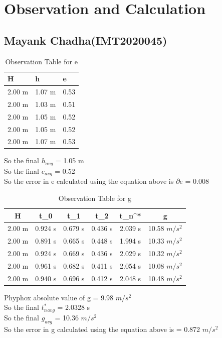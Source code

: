 \documentclass[11pt]{scrartcl} %
\begin{document}
\section{Observation and Calculation}
\subsection{Mayank Chadha(IMT2020045)}

\begin{table}[h] %
	\centering %
	\begin{tabular}{l l l}
		\toprule
		\textbf{H} & \textbf{h} & \textbf{e} \\
		\midrule
		2.00 m & 1.07 m & 0.53\\
        2.00 m & 1.03 m & 0.51\\
        2.00 m & 1.05 m & 0.52\\
        2.00 m & 1.05 m & 0.52\\
        2.00 m & 1.07 m & 0.53\\
		\bottomrule
	\end{tabular}
	\caption{Observation Table for e}
\end{table}
So the final $h_{avg}$ = 1.05 m\\
So the final $e_{avg}$ = 0.52\\
So the error in e calculated using the equation above is $\partial{e}$ = 0.008 

\begin{table}[h]
\centering
\begin{tabular}{||c c c c c c||} 
\toprule
 \hline
 H & t_0 & t_1 & t_2 & t_n^* & g \\ [0.5ex] 
 \midrule
 \hline\hline
 2.00 m & 0.924 s & 0.679 s  & 0.436 s & 2.039 s & 10.58 $m/s^2$  \\ 
 \hline
 2.00 m & 0.891 s & 0.665 s & 0.448 s & 1.994 s & 10.33 $m/s^2$  \\
 \hline
 2.00 m & 0.924 s & 0.669 s & 0.436 s & 2.029 s  & 10.32 $m/s^2$   \\
 \hline
 2.00 m & 0.961 s & 0.682 s & 0.411 s & 2.054 s  & 10.08 $m/s^2$   \\
 \hline
 2.00 m & 0.940 s & 0.696 s & 0.412 s & 2.048 s  & 10.48 $m/s^2$  \\ [1ex]
 \bottomrule
 \hline
\end{tabular}
\caption{Observation Table for g}
\end{table}
Phyphox absolute value of g = 9.98 $m/s^2$ \\
So the final $t_n^*_{avg}$ = 2.0328 s\\
So the final $g_{avg}$ = 10.36 $m/s^2$\\
So the error in g calculated using the equation above is  = 0.872  $m/s^2$\\
\end{document}
